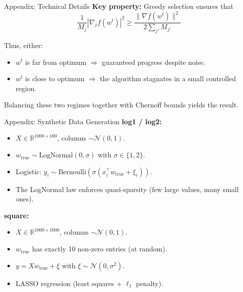 \documentclass[10pt]{beamer}
\begin{document}
\begin{frame}[allowframebreaks]{Appendix: Technical Details}
\vspace{0.5em}
\textbf{Key property:} Greedy selection ensures that
\[
\frac{1}{M_j} |\nabla_j f(w^t)|^2 \geq \frac{\|\nabla f(w^t)\|^2}{2 \sum_{j'} M_{j'}}
\]

\vspace{0.5em}
Thus, either:
\begin{itemize}
\item $w^t$ is far from optimum $\Rightarrow$ guaranteed progress despite noise.
\item $w^t$ is close to optimum $\Rightarrow$ the algorithm stagnates in a small controlled region.
\end{itemize}

Balancing these two regimes together with Chernoff bounds yields the result.
\end{frame}

\begin{frame}{Appendix: Synthetic Data Generation}
\textbf{log1 / log2:}
\begin{itemize}
\item $X \in \mathbb{R}^{1000 \times 100}$, columns $\sim \mathcal{N}(0, 1)$.
\item $w_{\text{true}} \sim \text{LogNormal}(0, \sigma)$ with $\sigma \in \{1, 2\}$.
\item Logistic: $y_i \sim \text{Bernoulli}(\sigma(x_i^\top w_{\text{true}} + \xi_i))$.
\item The LogNormal law enforces quasi-sparsity (few large values, many small ones).
\end{itemize}

\vspace{1em}
\textbf{square:}
\begin{itemize}
\item $X \in \mathbb{R}^{1000 \times 1000}$, columns $\sim \mathcal{N}(0, 1)$.
\item $w_{\text{true}}$ has exactly 10 non-zero entries (at random).
\item $y = X w_{\text{true}} + \xi$ with $\xi \sim \mathcal{N}(0, \sigma^2)$.
\item LASSO regression (least squares + $\ell_1$ penalty).
\end{itemize}
\end{frame}
\end{document}
